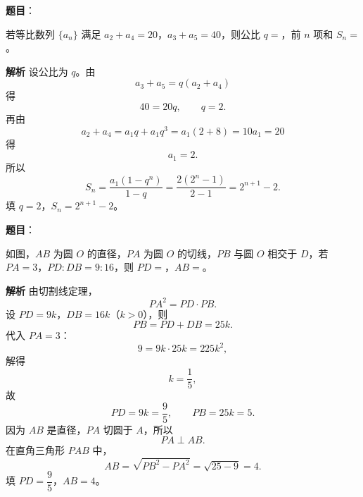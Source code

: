 \begin{answer}

\textbf{题目}：

若等比数列 $\{a_n\}$ 满足 $a_2+a_4=20$，$a_3+a_5=40$，则公比 $q=$\gkblank{}，前 $n$ 项和 $S_n=$\gkblank{}。

\textbf{解析}
设公比为 $q$。由
\nopagebreak[4]
\[a_3+a_5=q(a_2+a_4)\]
得
\nopagebreak[4]
\[40=20q,\qquad q=2.\]
再由
\nopagebreak[4]
\[a_2+a_4=a_1q+a_1q^3=a_1(2+8)=10a_1=20\]
得
\nopagebreak[4]
\[a_1=2.\]
所以
\nopagebreak[4]
\[S_n=\frac{a_1(1-q^n)}{1-q}=\frac{2(2^n-1)}{2-1}=2^{n+1}-2.\]
填 $q=2$，$S_n=2^{n+1}-2$。


\end{answer}
\begin{answer}

\textbf{题目}：

如图，$AB$ 为圆 $O$ 的直径，$PA$ 为圆 $O$ 的切线，$PB$ 与圆 $O$ 相交于 $D$，若 $PA=3$，$PD:DB=9:16$，则 $PD=$\gkblank{}，$AB=$\gkblank{}。
\nopagebreak[4]
\begin{center}\end{center}
\nopagebreak[4]
\textbf{解析}
由切割线定理，
\nopagebreak[4]
\[PA^2=PD\cdot PB.\]
设 $PD=9k$，$DB=16k$（$k>0$），则
\nopagebreak[4]
\[PB=PD+DB=25k.\]
代入 $PA=3$：
\nopagebreak[4]
\[9=9k\cdot25k=225k^2,\]
解得
\nopagebreak[4]
\[k=\frac15,\]
故
\nopagebreak[4]
\[PD=9k=\frac95,\qquad PB=25k=5.\]
因为 $AB$ 是直径，$PA$ 切圆于 $A$，所以
\nopagebreak[4]
\[PA\perp AB.\]
在直角三角形 $PAB$ 中，
\nopagebreak[4]
\[AB=\sqrt{PB^2-PA^2}=\sqrt{25-9}=4.\]
填 $PD=\dfrac95$，$AB=4$。


\end{answer}
